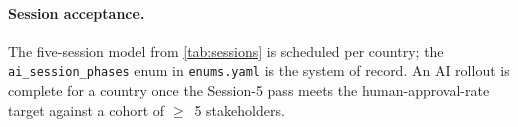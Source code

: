 \paragraph{Session acceptance.} The five-session model from
\cref{tab:sessions} is scheduled per country; the
\texttt{ai\_session\_phases} enum in \texttt{enums.yaml} is the system
of record. An AI rollout is complete for a country once the
Session-5 pass meets the human-approval-rate target against a cohort
of $\geq$~5 stakeholders.
